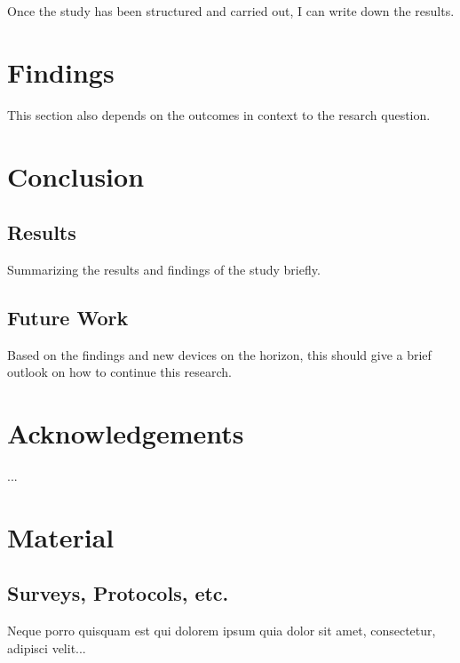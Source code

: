         Once the study has been structured and carried out, I can write down the results.

    \chapter{Findings}

        This section also depends on the outcomes in context to the resarch question.

    \chapter{Conclusion}

        \section{Results}

            Summarizing the results and findings of the study briefly.

        \section{Future Work}


            Based on the findings and new devices on the horizon, this should give a brief outlook on how to continue this research.

    \chapter{Acknowledgements}

        ...

    \appendix

        \chapter{Material}

            \section{Surveys, Protocols, etc.}

                Neque porro quisquam est qui dolorem ipsum quia dolor sit amet, consectetur, adipisci velit...


        \listoffigures %
        \listoftables %


     
    

    \clearpage\thispagestyle{empty}
    \eigen  %

